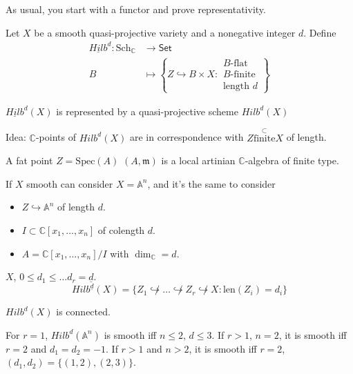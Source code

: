 \medskip\noindent

As usual, you start with a functor and
prove representativity.

\begin{definition}
\label{definition-hilbert-scheme}
Let $X$ be a smooth
quasi-projective variety and a nonegative
integer $d$.
Define
$$
\begin{aligned}
\underline{Hilb}^d: \text{Sch}_\mathbb{C}
&\longrightarrow \mathsf{Set} \\
B &\longmapsto \left\{Z \hookrightarrow B
\times X:
\substack{B\text{-flat} \\ B\text{-finite}\\
\text{length }d}\right\}
\end{aligned}
$$
\end{definition}

\begin{theorem}[Grothendieck]
\label{theorem-grothendieck}
$\underline{Hilb}^d(X)$ is represented by a
quasi-projective
scheme $Hilb^d(X)$
\end{theorem}

Idea: $\mathbb{C}$-points of $Hilb^d(X)$
are in correspondence with $Z
\overset{\subset}{\text{finite}}X$
of length.

A fat point $Z= \text{Spec}(A)$ $(A,
\mathfrak{m})$ is a
local artinian $\mathbb{C}$-algebra of finite
type.

If $X$ smooth can consider $X=\mathbb{A}^n$,
and it's the same to consider
\begin{itemize}
\item $Z \hookrightarrow \mathbb{A}^n$ of
length $d$.
\item $I \subset \mathbb{C}[x_1,\ldots,x_n]$
of
colength $d$.
\item $A= \mathbb{C}[x_1,\ldots,x_n]/I$ with
$\dim_\mathbb{C}=d$.
\end{itemize}

\begin{definition}
\label{definition-nested-hilbert-scheme}
$X$, $0 \leq d_1 \leq \ldots
d_r=\underline{d}$.
$$
Hilb^{\underline{d}}(X)=
\{Z_1\not\hookrightarrow
\ldots
\not\hookrightarrow Z_r  \not\hookrightarrow
X:
\text{len}(Z_i)=d_i\}
$$
\end{definition}

\begin{theorem}[Hartshorne (r=0), Fogarty,
Kalpan (r>1)]
\label{theorem-hk}
$Hilb^d(X)$ is connected.
\end{theorem}

For $r=1$, $Hilb^d(\mathbb{A}^n)$ is smooth
iff
$n \leq 2$, $d \leq 3$.
If $r>1$, $n=2$, it is smooth iff $r=2$ and
$d_1=d_2=-1$.
If $r>1$ and $n>2$, it is smooth iff $r=2$,
$(d_1,d_2)=\{(1,2),(2,3)\}$.

